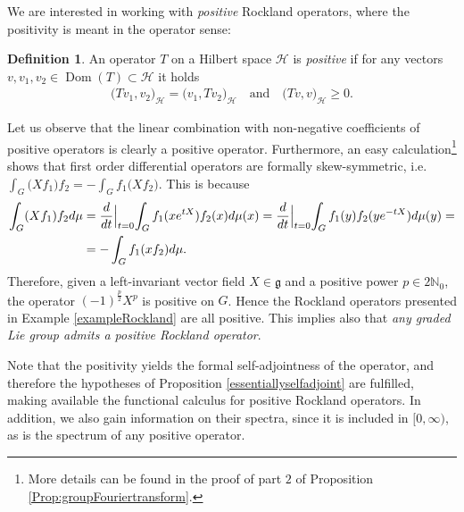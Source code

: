 \documentclass[12pt,oneside,a4paper]{book}
\numberwithin{equation}{section}     %
\theoremstyle{plain}
\theoremstyle{definition}
\newtheorem{definition}[theorem]{Definition}
\DeclareMathOperator{\Dom}{Dom}
\newcommand{\N}{{\mathbb N}}
\begin{document}
We are interested in working with \textit{positive} Rockland operators, where the positivity is meant in the operator sense:
\begin{definition}
	An operator $T$ on a Hilbert space $\mathcal{H}$ is \textit{positive} if for any vectors $v,v_1,v_2\in\Dom(T)\subset\mathcal H$ it holds
	\begin{align*}
	\big(Tv_1,v_2\big)_{\mathcal{H}}=\big(v_1,Tv_2\big)_{\mathcal{H}} \quad \text{and} \quad \big(Tv,v\big)_{\mathcal{H}} \geq 0.
	\end{align*}
\end{definition} 
Let us observe that the linear combination with non-negative coefficients of positive operators is clearly a positive operator. Furthermore, an easy calculation\footnote{More details can be found in the proof of part $2$ of Proposition \ref{Prop:groupFouriertransform}.} shows that first order differential operators are formally skew-symmetric, i.e. $\int_G \big(Xf_1\big)f_2=-\int_Gf_1\big(Xf_2\big)$. This is because
\begin{align*}
\int_G(Xf_1)f_2d\mu&=\frac{d}{dt}\Bigl|_{t=0}\int_Gf_1(xe^{tX})f_2(x)d\mu(x)=\frac{d}{dt}\Bigl|_{t=0}\int_Gf_1(y)f_2(ye^{-tX})d\mu(y)=\\
&=-\int_Gf_1(xf_2)d\mu.
\end{align*}
Therefore, given a left-invariant vector field $X\in\mathfrak{g}$ and a positive power $p\in 2\N_0$, the operator $(-1)^{\frac{p}{2}}X^p$ is positive on $G$. Hence the Rockland operators presented in Example \ref{exampleRockland} are all positive. This implies also that \textit{any graded Lie group admits a positive Rockland operator}.

Note that the positivity yields the formal self-adjointness of the operator, and therefore the hypotheses of Proposition \ref{essentiallyselfadjoint} are fulfilled, making available the functional calculus for positive Rockland operators. In addition, we also gain information on their spectra, since it is included in $[0,\infty)$, as is the spectrum of any positive operator. 
\end{document}
